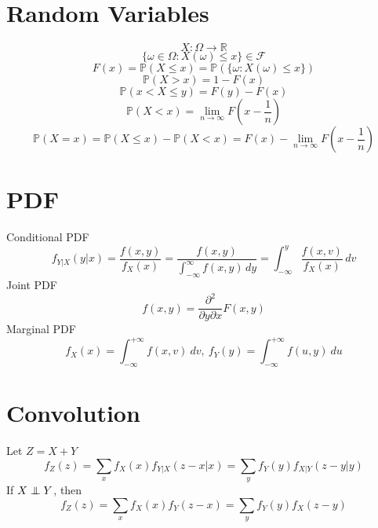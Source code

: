 \documentclass[twocolumn]{amsart}
\renewcommand{\P}{\mathbb{P}}
\newcommand\independent{\protect\mathpalette{\protect\independenT}{\perp}}
\def\independenT#1#2{\mathrel{\rlap{$#1#2$}\mkern3mu{#1#2}}}
\begin{document}
\section*{Random Variables}
\begin{equation*}
  X: \Omega \rightarrow \mathbb{R}
\end{equation*}
\begin{equation*}
  \{\omega \in \Omega : X(\omega) \leq x\} \in \mathcal{F}
\end{equation*}
\begin{equation*}
  F(x) = \P(X \leq x) = \P(\{\omega : X(\omega) \leq x\})
\end{equation*}
\begin{equation*}
  \P(X>x) = 1-F(x)
\end{equation*}
\begin{equation*}
  \P(x<X\leq y) = F(y) - F(x)
\end{equation*}
\begin{equation*}
  \P(X<x) = \lim_{n\to \infty}F(x - \frac{1}{n})
\end{equation*}
\begin{equation*}
  \P(X=x) = \P(X\leq x) - \P(X < x) = F(x)-\lim_{n\to \infty}F(x-\frac{1}{n})
\end{equation*}

\section*{PDF}
Conditional PDF
\begin{equation*}
  f_{Y|X}(y|x) = \frac{f(x,y)}{f_{X}(x)} =
  \frac{f(x,y)}{\int_{-\infty}^{\infty}f(x,y)\,dy} = \int_{-\infty}^{y} \frac{f(x,v)}{f_{X}(x)}\,dv
\end{equation*}
Joint PDF
\begin{equation*}
  f(x,y) = \frac{\partial^{2}}{\partial y \partial x}F(x,y)
\end{equation*}
Marginal PDF
\begin{equation*}
  f_{X}(x) = \int_{-\infty}^{+\infty} f(x,v)~dv,~f_{Y}(y) = \int_{-\infty}^{+\infty} f(u,y)~du
\end{equation*}

\section*{Convolution}
Let $Z=X+Y$
\begin{equation*}
  f_{Z}(z)=\sum_{x}f_{X}(x)f_{Y|X}(z-x|x) = \sum_{y}f_{Y}(y)f_{X|Y}(z-y|y)
\end{equation*}
If \(X \independent Y\), then
\begin{equation*}
  f_{Z}(z)=\sum_{x}f_{X}(x)f_{Y}(z-x) = \sum_{y}f_{Y}(y)f_{X}(z-y)
\end{equation*}
\end{document}
